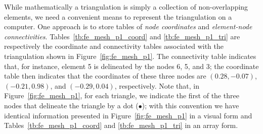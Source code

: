 While mathematically a triangulation is simply a collection of non-overlapping elements, we need a convenient means to represent the triangulation on a computer.  One approach is to store tables of \emph{node coordinates} and \emph{element-node connectivities}.  Tables~\ref{tb:fe_mesh_p1_coord} and \ref{tb:fe_mesh_p1_tri} are respectively the coordinate and connectivity tables associated with the triangulation shown in Figure~\ref{fig:fe_mesh_p1}. The connectivity table indicates that, for instance, element 5 is delineated by the nodes 6, 5, and 3; the coordinate table then indicates that the coordinates of these three nodes are $(0.28,-0.07)$, $(-0.21,0.98)$, and $(-0.29,0.04)$, respectively.  Note that, in Figure~\ref{fig:fe_mesh_p1}, for each triangle, we indicate the first of the three nodes that delineate the triangle by a dot ($\bullet$); with this convention we have identical information presented in Figure~\ref{fig:fe_mesh_p1} in a visual form and Tables~\ref{tb:fe_mesh_p1_coord} and \ref{tb:fe_mesh_p1_tri} in an array form.

\begin{table}
  \centering
  \caption{Node coordinate and connectivity table for mesh shown in Figure~\ref{fig:fe_mesh_p1}.}
  \label{tb:fe_mesh_p1}
\end{table}

